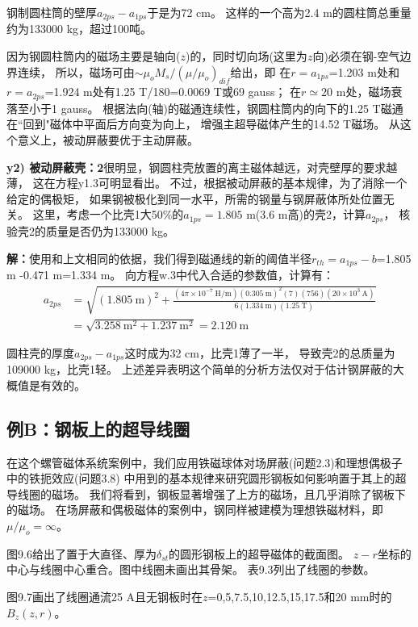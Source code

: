 钢制圆柱筒的壁厚$a_{2ps}-a_{1ps}$于是为72 cm。
这样的一个高为2.4 m的圆柱筒总重量约为133000 kg，超过100吨。

因为钢圆柱筒内的磁场主要是轴向($z$)的，同时切向场(这里为$z$向)必须在钢-空气边界连续，
所以，磁场可由$\sim \mu_o M_s/(\mu/\mu_o)_{dif}$给出，即
在$r=a_{1ps}$=1.203 m处和$r=a_{2ps}$=1.924 m处有1.25 T/180=0.0069 T或69 gauss；
在$r\simeq 20$ m处，磁场衰落至小于1 gauss。
根据法向(轴)的磁通连续性，钢圆柱筒内的向下的1.25 T磁通在``回到"磁体中平面后方向变为向上，
增强主超导磁体产生的14.52 T磁场。
从这个意义上，被动屏蔽要优于主动屏蔽。

\textbf{y2) 被动屏蔽壳：2}\qquad 很明显，钢圆柱壳放置的离主磁体越远，对壳壁厚的要求越薄，
这在方程y1.3可明显看出。
不过，根据被动屏蔽的基本规律，为了消除一个给定的偶极矩，
如果钢被极化到同一水平，所需的钢量与钢屏蔽体所处位置无关。
这里，考虑一个比壳1大50\%的$a_{1ps}=1.805$ m(3.6 m高)的壳2，计算$a_{2ps}$，
核验壳2的质量是否仍为133000 kg。

\textbf{解：}使用和上文相同的依据，我们得到磁通线的新的阈值半径$r_{th}=a_{1ps}-b$=1.805 m
-0.471 m=1.334 m。
向方程w.3中代入合适的参数值，计算有：
\begin{align*}%
a_{2ps}&=\sqrt{(1.805\ \mathrm{m})^2+\frac{(4\pi\times 10^{-7}\ \mathrm{H/m})(0.305\ \mathrm{m})^2(7)(756)(20\times 10^3\ \mathrm{A})}{6(1.334\ \mathrm{m})(1.25\ \mathrm{T})}}\\
&=\sqrt{3.258\ \mathrm{m^2}+1.237\ \mathrm{m^2}}=2.120\ \mathrm{m}
\end{align*}

圆柱壳的厚度$a_{2ps}-a_{1ps}$这时成为32 cm，比壳1薄了一半，
导致壳2的总质量为109000 kg，比壳1轻。
上述差异表明这个简单的分析方法仅对于估计钢屏蔽的大概值是有效的。


\subsection{例B：钢板上的超导线圈}
在这个螺管磁体系统案例中，我们应用铁磁球体对场屏蔽(问题2.3)和理想偶极子中的铁扼效应(问题3.8)
中用到的基本规律来研究圆形钢板如何影响置于其上的超导线圈的磁场。
我们将看到，钢板显著增强了上方的磁场，且几乎消除了钢板下的磁场。
在场屏蔽和偶极磁体的案例中，钢同样被建模为理想铁磁材料，即$\mu/\mu_o=\infty$。

图9.6给出了置于大直径、厚为$\delta_{st}$的圆形钢板上的超导磁体的截面图。
$z-r$坐标的中心与线圈中心重合。图中线圈未画出其骨架。
表9.3列出了线圈的参数。

图9.7画出了线圈通流25 A且无钢板时在$z$=0,5,7.5,10,12.5,15,17.5和20 mm时的$B_z(z,r)$。


